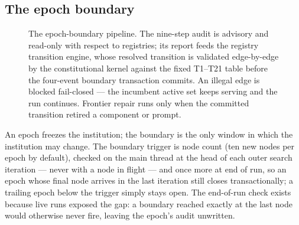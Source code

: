 \subsection{The epoch boundary}\label{sec:rqgm:boundary}

\begin{figure}[t]
  \centering
  \resizebox{\columnwidth}{!}{}
  \caption{The epoch-boundary pipeline. The nine-step audit is
    advisory and read-only with respect to registries; its report
    feeds the registry transition engine, whose resolved transition
    is validated edge-by-edge by the constitutional kernel against
    the fixed T1--T21 table before the four-event boundary
    transaction commits. An illegal edge is blocked fail-closed ---
    the incumbent active set keeps serving and the run continues.
    Frontier repair runs only when the committed transition retired a
    component or prompt.}
  \label{fig:rqgm-boundary}
\end{figure}

An epoch freezes the institution; the boundary is the only window in
which the institution may change. The boundary trigger is node count
(ten new nodes per epoch by default), checked on the main thread at
the head of each outer search iteration --- never with a node in
flight --- and once more at end of run, so an epoch whose final node
arrives in the last iteration still closes transactionally; a
trailing epoch below the trigger simply stays open. The end-of-run
check exists because live runs exposed the gap: a boundary reached
exactly at the last node would otherwise never fire, leaving the
epoch's audit unwritten.

